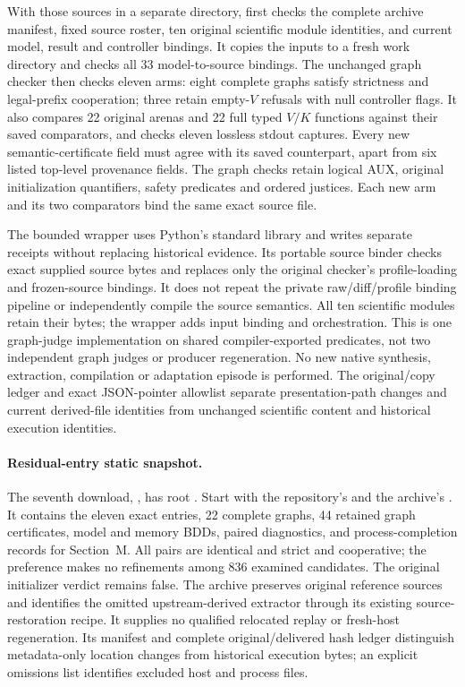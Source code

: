 With those sources in a separate directory,
 first checks the complete archive
manifest, fixed source roster, ten original scientific module identities,
and current model, result and controller bindings. It copies the inputs
to a fresh work directory and checks all 33 model-to-source bindings.
The unchanged graph checker then checks eleven arms: eight complete
graphs satisfy strictness and legal-prefix cooperation; three retain
empty-$V$ refusals with null controller flags. It also compares
22 original arenas and 22 full typed $V/K$ functions against their
saved comparators, and checks eleven lossless stdout captures. Every
new semantic-certificate field must agree with its saved counterpart,
apart from six listed top-level provenance fields.
The graph checks retain logical AUX, original initialization quantifiers,
safety predicates and ordered justices. Each new arm and its two
comparators bind the same exact source file.

The bounded wrapper uses Python's standard library and writes separate
receipts without replacing historical evidence. Its portable source
binder checks exact supplied source bytes and replaces only the original
checker's profile-loading and frozen-source bindings. It does not
repeat the private raw/diff/profile binding pipeline or independently
compile the source semantics. All ten scientific modules retain their
bytes; the wrapper adds input binding and orchestration. This is one
graph-judge implementation on shared compiler-exported predicates,
not two independent graph judges or producer regeneration. No new
native synthesis, extraction, compilation or adaptation episode is
performed. The original/copy ledger and exact JSON-pointer allowlist
separate presentation-path changes and current derived-file identities
from unchanged scientific content and historical execution identities.

\paragraph{Residual-entry static snapshot.}
The seventh download,
, has root
. Start with the repository's
 and the archive's .
It contains the eleven exact entries, 22 complete graphs, 44 retained
graph certificates, model and memory BDDs, paired diagnostics, and
process-completion records for Section~M. All pairs are identical and
strict and cooperative; the preference makes no refinements among
836 examined candidates. The original initializer verdict remains false.
The archive preserves original reference sources and identifies the
omitted upstream-derived extractor through its existing source-restoration
recipe. It supplies no qualified relocated replay or fresh-host regeneration. Its manifest and complete
original/delivered hash ledger distinguish metadata-only location
changes from historical execution bytes; an explicit omissions list
identifies excluded host and process files.

